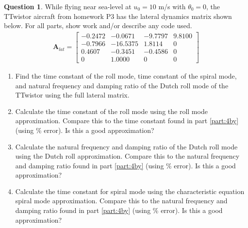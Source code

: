\documentclass{article}
\theoremstyle{definition}
\newtheorem{question}{Question}
\begin{document}
\begin{question}
    While flying near sea-level at $u_0 = 10$ m/s with $\theta_0 = 0$, the TTwistor aircraft from homework P3 has the lateral dynamics matrix shown below. For all parts, show work and/or describe any code used.
    \begin{align*}
        \mathbf{A}_{lat} = 
        \begin{bmatrix}
         -0.2472 & -0.0671 & -9.7797 & 9.8100 \\
         -0.7966 & -16.5375 & 1.8114 & 0 \\
         0.4607 & -0.3451 & -0.4586 &  0 \\
         0 & 1.0000 & 0 & 0
        \end{bmatrix}
    \end{align*}
    \begin{enumerate}[label=\alph*)]
        \item Find the time constant of the roll mode, time constant of the spiral mode, and natural frequency and damping ratio of the Dutch roll mode of the TTwistor using the full lateral matrix. \label{part:4by}
        \item Calculate the time constant of the roll mode using the roll mode approximation. Compare this to the time constant found in part \ref{part:4by} (using \% error). Is this a good approximation?
        \item Calculate the natural frequency and damping ratio of the Dutch roll mode using the Dutch roll approximation. Compare this to the natural frequency and damping ratio found in part \ref{part:4by} (using \% error). Is this a good approximation?
        \item Calculate the time constant for spiral mode using the characteristic equation spiral mode approximation. Compare this to the natural frequency and damping ratio found in part \ref{part:4by} (using \% error). Is this a good approximation?
    \end{enumerate}

\end{question}
\end{document}
